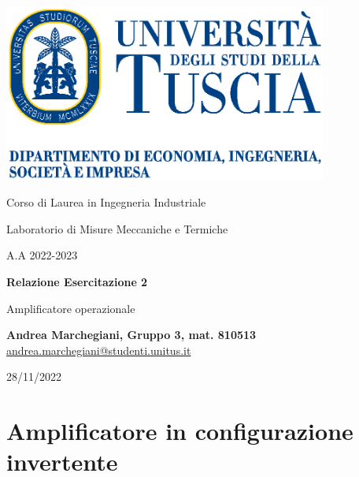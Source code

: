 \documentclass[a4paper, 12pt, twoside]{report}
\begin{document}
\begin{titlepage}
	\begin{center}
		
		\includegraphics[width=0.8\textwidth]{figures/unitus_marchio_2020_DEIM}
		
		\vspace{0.5cm}
		
		{\Large Corso di Laurea in Ingegneria Industriale}
		
		\vspace{0.5cm}
		
		{\Large Laboratorio di Misure Meccaniche e Termiche}
		
		\vspace{0.5cm}
		
		{\Large A.A 2022-2023}
		
		\vspace{1.5cm}
		
		\textbf{{\Huge Relazione Esercitazione 2}}
		
		\vspace{0.5cm}
		{\LARGE Amplificatore operazionale}
		
		\vspace{1.5cm}
		
		\textbf{Andrea Marchegiani, Gruppo 3, mat. 810513}\\
		\href{mailto:andrea.marchegiani@studenti.unitus.it}{andrea.marchegiani@studenti.unitus.it} 
		
		
		\vfill
		
		
		
		28/11/2022
		
	\end{center}
\end{titlepage}
	
	
	\tableofcontents 
	\newpage
	
	
	\section{Amplificatore in configurazione invertente} 
	
\end{document}
